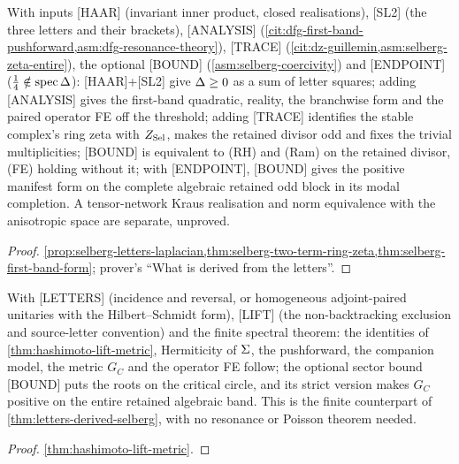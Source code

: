 \begin{theorem}
\label{thm:letters-derived-selberg}
With inputs [HAAR] (invariant inner product, closed realisations), [SL2] (the three letters and
their brackets), [ANALYSIS] (\cref{cit:dfg-first-band-pushforward,asm:dfg-resonance-theory}),
[TRACE] (\cref{cit:dz-guillemin,asm:selberg-zeta-entire}), the optional [BOUND]
(\cref{asm:selberg-coercivity}) and [ENDPOINT] ($\tfrac14\notin\operatorname{spec}\Delta$):
[HAAR]+[SL2] give $\Delta\ge0$ as a sum of letter squares; adding [ANALYSIS] gives the first-band
quadratic, reality, the branchwise form and the paired operator FE off the threshold; adding
[TRACE] identifies the stable complex's ring zeta with $Z_{\mathrm{Sel}}$, makes the retained divisor odd and
fixes the trivial multiplicities; [BOUND] is equivalent to (RH) and (Ram) on the retained divisor,
(FE) holding without it; with [ENDPOINT], [BOUND] gives the positive manifest form on the complete
algebraic retained odd block in its modal completion. A tensor-network Kraus realisation and norm
equivalence with the anisotropic space are separate, unproved.
\end{theorem}
\begin{proof}
\cref{prop:selberg-letters-laplacian,thm:selberg-two-term-ring-zeta,thm:selberg-first-band-form};
prover's ``What is derived from the letters''.
\end{proof}

\begin{theorem}
\label{thm:letters-derived-finite}
With [LETTERS] (incidence and reversal, or homogeneous adjoint-paired unitaries with the
Hilbert--Schmidt form), [LIFT] (the non-backtracking exclusion and source-letter convention) and
the finite spectral theorem: the identities of \cref{thm:hashimoto-lift-metric}, Hermiticity of
$\Sigma$, the pushforward, the companion model, the metric $G_C$ and the operator FE follow; the
optional sector bound [BOUND] puts the roots on the critical circle, and its strict version makes
$G_C$ positive on the entire retained algebraic band. This is the finite counterpart of
\cref{thm:letters-derived-selberg}, with no resonance or Poisson theorem needed.
\end{theorem}
\begin{proof}
\cref{thm:hashimoto-lift-metric}.
\end{proof}

